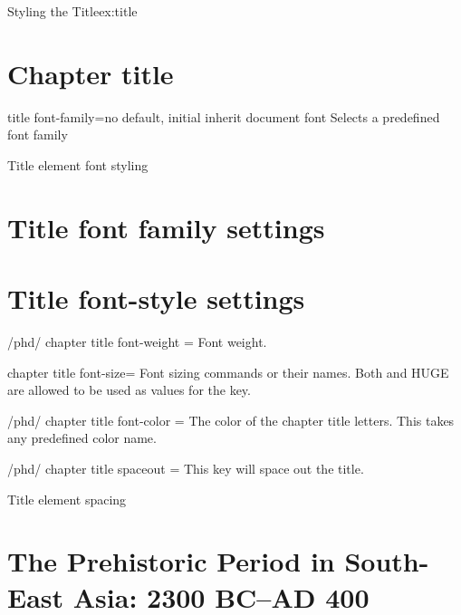 \begin{texexample}{Styling the Title}{ex:title} 
\chapter{Chapter title}
\lorem
\end{texexample}


\begin{docKey}[phd]{title font-family}{=}{no default, initial inherit document font}
Selects a predefined font family
\end{docKey}

\begin{texexample}{Title element font styling}{}
\chapter{Title font family settings}
\lorem
{}
\chapter{Title font-style settings}
\lorem
\end{texexample}

\begin{key}{/phd/ chapter title font-weight = } Font weight.
\end{key}

\begin{docKey}[phd]{chapter title font-size}{= }{}
Font sizing commands or their names. Both \cmd{\HUGE} and HUGE are allowed to be used as values for the key.
\end{docKey}

\begin{key}{/phd/ chapter title font-color = }
The color of the chapter title letters. This takes any predefined color name. 
\end{key}


\begin{key}{/phd/ chapter title spaceout = }
 This key will space out the title. 
\end{key}

\begin{texexample}{Title element spacing}{}
\chapter{The Prehistoric Period in South-East Asia: 2300 BC--AD 400}        
\lorem 
    
\end{texexample}

